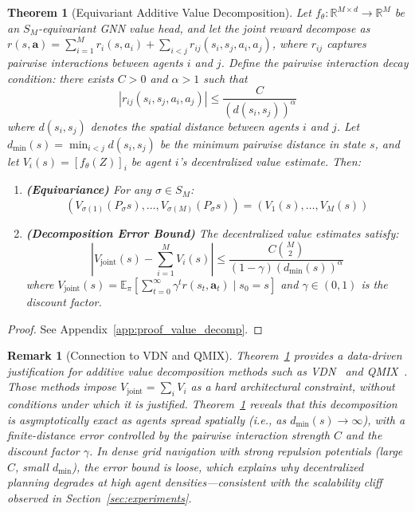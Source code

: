 \documentclass[11pt,a4paper]{article}
\newtheorem{theorem}{Theorem}
\newtheorem{remark}{Remark}
\begin{document}
\begin{theorem}[Equivariant Additive Value Decomposition]\label{thm:value_decomp}
Let $f_\theta: \mathbb{R}^{M \times d} \to \mathbb{R}^M$ be an $S_M$-equivariant GNN value head, and let the joint reward decompose as $r(s, \mathbf{a}) = \sum_{i=1}^{M} r_i(s, a_i) + \sum_{i < j} r_{ij}(s_i, s_j, a_i, a_j)$, where $r_{ij}$ captures pairwise interactions between agents $i$ and $j$. Define the pairwise interaction decay condition: there exists $C > 0$ and $\alpha > 1$ such that
\begin{equation}
    |r_{ij}(s_i, s_j, a_i, a_j)| \leq \frac{C}{(d(s_i, s_j))^\alpha}
\end{equation}
where $d(s_i, s_j)$ denotes the spatial distance between agents $i$ and $j$. Let $d_{\min}(s) = \min_{i < j} d(s_i, s_j)$ be the minimum pairwise distance in state $s$, and let $V_i(s) = [f_\theta(Z)]_i$ be agent $i$'s decentralized value estimate. Then:
\begin{enumerate}
    \item \textbf{(Equivariance)} For any $\sigma \in S_M$:
    \begin{equation}
        (V_{\sigma(1)}(P_\sigma s), \ldots, V_{\sigma(M)}(P_\sigma s)) = (V_1(s), \ldots, V_M(s))
    \end{equation}
    \item \textbf{(Decomposition Error Bound)} The decentralized value estimates satisfy:
    \begin{equation}
        \left| V_{\mathrm{joint}}(s) - \sum_{i=1}^{M} V_i(s) \right| \leq \frac{C \binom{M}{2}}{(1 - \gamma)(d_{\min}(s))^\alpha}
    \end{equation}
    where $V_{\mathrm{joint}}(s) = \mathbb{E}_\pi\left[\sum_{t=0}^{\infty} \gamma^t r(s_t, \mathbf{a}_t) \mid s_0 = s\right]$ and $\gamma \in (0,1)$ is the discount factor.
\end{enumerate}
\end{theorem}

\begin{proof}
See Appendix~\ref{app:proof_value_decomp}.
\end{proof}

\begin{remark}[Connection to VDN and QMIX]
Theorem~\ref{thm:value_decomp} provides a \emph{data-driven} justification for additive value decomposition methods such as VDN~\cite{sunehag2017value} and QMIX~\cite{rashid2018qmix}. Those methods impose $V_{\mathrm{joint}} = \sum_i V_i$ as a hard architectural constraint, without conditions under which it is justified. Theorem~\ref{thm:value_decomp} reveals that this decomposition is asymptotically exact as agents spread spatially (i.e., as $d_{\min}(s) \to \infty$), with a finite-distance error controlled by the pairwise interaction strength $C$ and the discount factor $\gamma$. In dense grid navigation with strong repulsion potentials (large $C$, small $d_{\min}$), the error bound is loose, which explains why decentralized planning degrades at high agent densities---consistent with the scalability cliff observed in Section~\ref{sec:experiments}.
\end{remark}
\end{document}
